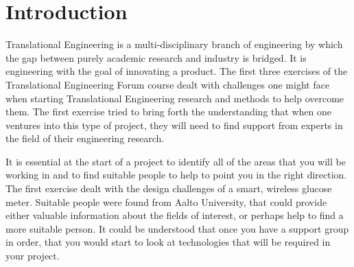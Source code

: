 \documentclass[english,12pt,a4paper,pdftex,elec,utf8]{aaltothesis}
\begin{document}

\author{Jan von Steuben 661119\\ Joseph Hotchkiss 658656}
\date{11.10.2018}


\makecoverpage


\newpage


\cleardoublepage
\storeinipagenumber
{}
\setcounter{page}{1}
\thispagestyle{empty}


\section*{Introduction}

	Translational Engineering is a multi-disciplinary branch of engineering by which the gap between purely academic research and industry is bridged. It is engineering with the goal of innovating a product. The first three exercises of the Translational Engineering Forum course dealt with challenges one might face when starting Translational Engineering research and methods to help overcome them. The first exercise tried to bring forth the understanding that when one ventures into this type of project, they will need to find support from experts in the field of their engineering research.  

	It is essential at the start of a project to identify all of the areas that you will be working in and to find suitable people to help to point you in the right direction. The first exercise dealt with the design challenges of a smart, wireless glucose meter. Suitable people were found from Aalto University, that could provide either valuable information about the fields of interest, or perhaps help to find a more suitable person. It could be understood that once you have a support group in order, that you would start to look at technologies that will be required in your project. 
	
\end{document}
